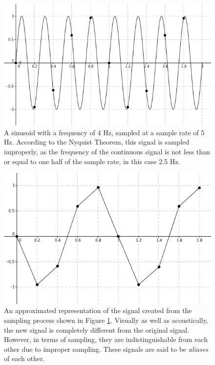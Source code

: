 \documentclass[12pt,twoside]{report}
\begin{document}
\begin{figure}

  \centering

  \includegraphics[scale=0.5]{img/sampled}

  \caption{A sinusoid with a frequency of 4 Hz, sampled at a sample rate of 5 Hz. According to the Nyquist Theorem, this signal is sampled improperly, as the frequency of the continuous signal is not less than or equal to one half of the sample rate, in this case 2.5 Hz. }

  \label{fig:sampled}

\end{figure}

\begin{figure}

  \centering

  \includegraphics[scale=0.5]{img/approx}

  \caption{An approximated representation of the signal created from the sampling process shown in Figure \ref{fig:sampled}. Visually as well as acoustically, the new signal is completely different from the original signal. However, in terms of sampling, they are indistinguishable from each other due to improper sampling. These signals are said to be \emph{aliases} of each other.}

  \label{fig:approx}

\end{figure}
\end{document}
